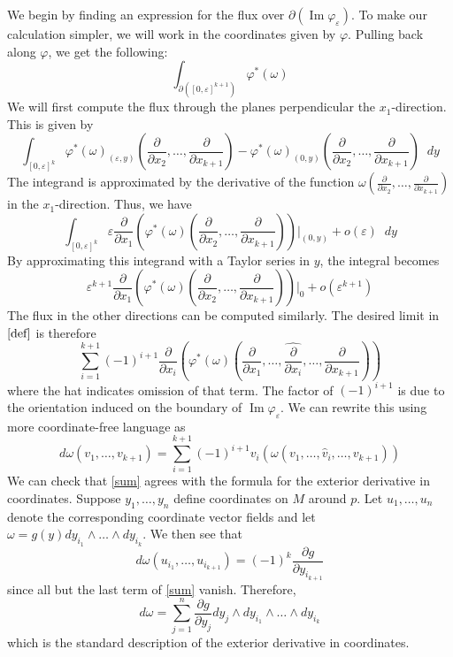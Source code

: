 \documentclass[12pt]{article}
\renewcommand{\Im}{\operatorname{Im}}
\newcommand{\diff}{\mathop{}\!d}
\begin{document}
We begin by finding an expression for the flux over $\partial (\Im \varphi_\varepsilon)$. To make our calculation simpler, we will work in the coordinates given by $\varphi$. Pulling back along $\varphi$, we get the following:
\begin{dmath}
\int_{\partial \left ([0, \varepsilon]^{k+1} \right)} \varphi^*(\omega)
\label{flux}
\end{dmath}
We will first compute the flux through the planes perpendicular the $x_1$-direction. This is given by
$$
\int_{[0, \varepsilon]^k} \varphi^*(\omega)_{(\varepsilon, y)} \left (\frac{\partial}{\partial x_2}, \ldots, \frac{\partial }{\partial x_{k+1}} \right)
- \varphi^* (\omega)_{ (0, y)}\left (\frac{\partial}{\partial x_2}, \ldots, \frac{\partial }{\partial x_{k+1}} \right)  \diff y
$$
The integrand is approximated by the derivative of the function $\omega \left ( \frac{\partial }{\partial x_2}, \ldots, \frac{\partial }{\partial x_{k+1}} \right)$ in the $x_1$-direction. Thus, we have
$$
\int_{[0, \varepsilon]^k} \varepsilon \frac{\partial}{\partial x_1}\left ( \varphi^*(\omega) \left (\frac{\partial}{\partial x_2}, \ldots, \frac{\partial }{\partial x_{k+1}} \right) \right) \bigg |_{(0, y)} + o (\varepsilon)\diff y
$$
By approximating this integrand with a Taylor series in $y$, the integral becomes
$$
\varepsilon^{k+1} \frac{\partial}{\partial x_1}\left ( \varphi^*(\omega) \left (\frac{\partial}{\partial x_2}, \ldots, \frac{\partial }{\partial x_{k+1}} \right) \right) \bigg |_{0} + o (\varepsilon^{k+1})
$$
The flux in the other directions can be computed similarly. The desired limit in $\eqref{def}$ is therefore
$$
\sum_{i = 1}^{k+1} (-1)^{i+1}\frac{\partial}{\partial x_i}\left ( \varphi^*(\omega) \left (\frac{\partial}{\partial x_1}, \ldots, \widehat {\frac{\partial}{\partial x_i}}, \ldots, \frac{\partial }{\partial x_{k+1}} \right) \right)
$$
where the hat indicates omission of that term. The factor of $(-1)^{i+1}$ is due to the orientation induced on the boundary of $\Im \varphi_\varepsilon$. We can rewrite this using more coordinate-free language as
\begin{dmath}
d \omega (v_1, \ldots, v_{k+1}) =
\sum_{i = 1}^{k+1}(-1)^{i+1} v_i \left ( \omega  \left (v_1, \ldots, \hat v_i, \ldots, v_{k+1}\right) \right)
\label{sum}
\end{dmath}
We can check that \eqref{sum} agrees with the formula for the exterior derivative in coordinates. Suppose $y_1, \ldots, y_n$ define coordinates on $M$ around $p$. Let $u_1, \ldots, u_n$ denote the corresponding coordinate vector fields and let $\omega = g(y) dy_{i_1} \wedge \ldots \wedge dy_{i_k}$. We then see that
$$
d\omega(u_{i_1}, \ldots, u_{i_{k+1}}) = (-1)^{k}\frac{\partial g}{\partial y_{i_{k+1}}}
$$
since all but the last term of \eqref{sum} vanish. Therefore,
$$
d \omega = \sum_{j=1}^n \frac{\partial g}{\partial y_j} dy_j \wedge dy_{i_1} \wedge\ldots \wedge dy_{i_k}
$$
which is the standard description of the exterior derivative in coordinates.
\end{document}
